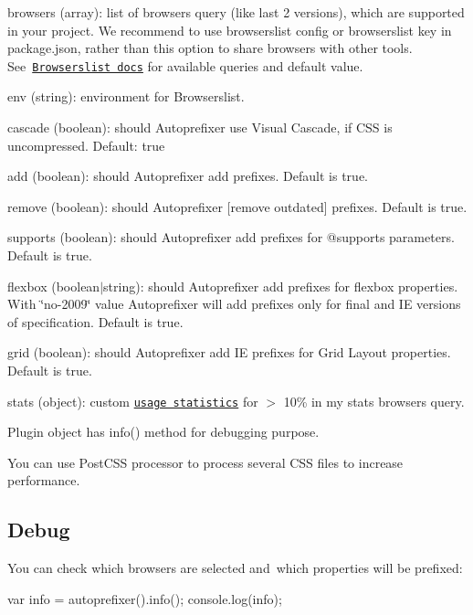 \begin{DoxyItemize}
\item {\ttfamily browsers} (array)\+: list of browsers query (like {\ttfamily last 2 versions}), which are supported in your project. We recommend to use {\ttfamily browserslist} config or {\ttfamily browserslist} key in {\ttfamily package.\+json}, rather than this option to share browsers with other tools. See \href{https://github.com/ai/browserslist#queries}{\tt Browserslist docs} for available queries and default value.
\item {\ttfamily env} (string)\+: environment for Browserslist.
\item {\ttfamily cascade} (boolean)\+: should Autoprefixer use Visual Cascade, if C\+SS is uncompressed. Default\+: {\ttfamily true}
\item {\ttfamily add} (boolean)\+: should Autoprefixer add prefixes. Default is {\ttfamily true}.
\item {\ttfamily remove} (boolean)\+: should Autoprefixer \mbox{[}remove outdated\mbox{]} prefixes. Default is {\ttfamily true}.
\item {\ttfamily supports} (boolean)\+: should Autoprefixer add prefixes for {\ttfamily @supports} parameters. Default is {\ttfamily true}.
\item {\ttfamily flexbox} (boolean$\vert$string)\+: should Autoprefixer add prefixes for flexbox properties. With {\ttfamily \char`\"{}no-\/2009\char`\"{}} value Autoprefixer will add prefixes only for final and IE versions of specification. Default is {\ttfamily true}.
\item {\ttfamily grid} (boolean)\+: should Autoprefixer add IE prefixes for Grid Layout properties. Default is {\ttfamily true}.
\item {\ttfamily stats} (object)\+: custom \href{https://github.com/ai/browserslist#custom-usage-data}{\tt usage statistics} for {\ttfamily $>$ 10\% in my stats} browsers query.
\end{DoxyItemize}

Plugin object has {\ttfamily info()} method for debugging purpose.

You can use Post\+C\+SS processor to process several C\+SS files to increase performance.

\subsection*{Debug}

You can check which browsers are selected and which properties will be prefixed\+:


\begin{DoxyCode}
var info = autoprefixer().info();
console.log(info);
\end{DoxyCode}
 